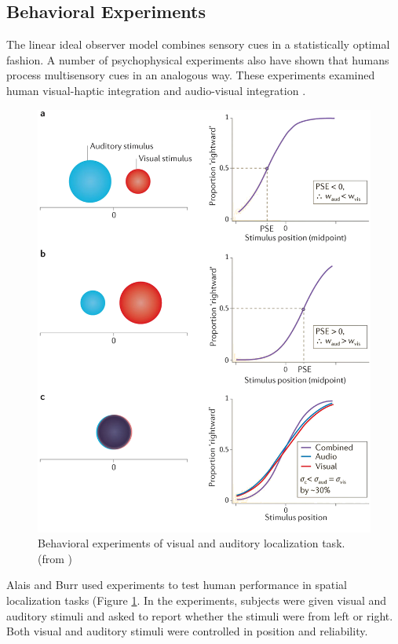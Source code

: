 \documentclass{article}[11pt]
\begin{document}
\subsection{Behavioral Experiments}
The linear ideal observer model combines sensory cues in a statistically optimal fashion. A number of psychophysical experiments also have shown that humans process multisensory cues in an analogous way. These experiments examined human visual-haptic integration \cite{ernst_humans_2002} and audio-visual integration \cite{alais_ventriloquist_2004}.

\begin{figure}[tpb]
  \centering
  \includegraphics[width=.9\textwidth]{fetsch-visaudloc}
  \caption{Behavioral experiments of visual and auditory localization task. (from \cite{fetsch_bridging_2013})}
  \label{fig:visaudloc}
\end{figure}

Alais and Burr \cite{alais_ventriloquist_2004} used experiments to test human performance in spatial localization tasks (Figure \ref{fig:visaudloc}. In the experiments, subjects were given visual and auditory stimuli and asked to report whether the stimuli were from left or right. Both visual and auditory stimuli were controlled in position and reliability.
\end{document}
